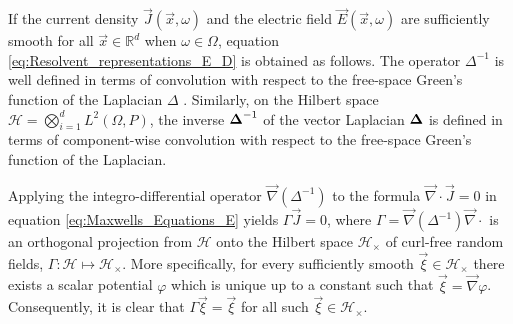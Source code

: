 \documentclass[11pt]{amsart}
\newcommand\bDelta{\mbox{\boldmath${\Delta}$}}
\begin{document}
If the current density $\vec{J}(\vec{x},\omega)$ and the electric
field $\vec{E}(\vec{x},\omega)$ are sufficiently smooth for all
$\vec{x}\in\mathbb{R}^d$ when $\omega\in\Omega$, equation 
\eqref{eq:Resolvent_representations_E_D} is obtained as
follows. The operator $\Delta^{-1}$ is
well defined in terms of convolution with respect to the free-space
Green's function of the Laplacian $\Delta$
\cite{Golden:CMP-473,Folland:95}. Similarly, on the Hilbert space 
$\mathscr{H}=\bigotimes_{i=1}^dL^2(\Omega,P)$, the inverse $\bDelta^{-1}$ of the
vector Laplacian $\bDelta$ is defined in terms of component-wise
convolution with respect to the free-space Green's function of the
Laplacian.

 

Applying the integro-differential operator $\vec{\nabla}(\Delta^{-1})$ to the
formula $\vec{\nabla}\cdot\vec{J}=0$ in equation
\eqref{eq:Maxwells_Equations_E} yields $\Gamma\vec{J}=0$, where
$\Gamma=\vec{\nabla}(\Delta^{-1})\vec{\nabla}\cdot$ is an orthogonal projection
\cite{Golden:CMP-473} from $\mathscr{H}$ onto the Hilbert space
$\mathscr{H}_\times$ of curl-free random fields,
$\Gamma:\mathscr{H}\mapsto\mathscr{H}_\times$. More specifically, for every
sufficiently smooth $\vec{\xi}\in\mathscr{H}_\times$ there exists
\cite{Jackson-1999} a scalar potential $\varphi$ which is unique up to a 
constant such that $\vec{\xi}=\vec{\nabla}\varphi$. Consequently, it is clear
that $\Gamma\vec{\xi}=\vec{\xi}$ for all such $\vec{\xi}\in\mathscr{H}_\times$. 
\end{document}
